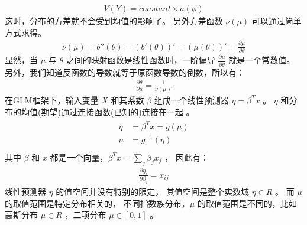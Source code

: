 \documentclass[letterpaper,10pt,english]{sphinxmanual}
\begin{document}
\begin{equation}\label{equation:广义线性模型/estimate:广义线性模型/estimate:3}
\begin{split}V(Y)=constant \times a(\phi)\end{split}
\end{equation}
这时，分布的方差就不会受到均值的影响了。
另外方差函数 \(\nu(\mu)\) 可以通过简单方式求得。
\begin{equation}\label{equation:广义线性模型/estimate:广义线性模型/estimate:4}
\begin{split}\nu(\mu) = b''(\theta) =(b'(\theta))'= (\mu(\theta))' = \frac{\partial \mu}{\partial \theta}\end{split}
\end{equation}
显然，当 \(\mu\) 与 \(\theta\) 之间的映射函数是线性函数时，一阶偏导 \(\frac{\partial \mu}{\partial \theta}\)
就是一个常数值。另外，我们知道反函数的导数就等于原函数导数的倒数，所以有：
\begin{equation}\label{equation:广义线性模型/estimate:广义线性模型/estimate:5}
\begin{split}\frac{\partial \theta}{\partial \mu} = \frac{1}{\nu(\mu)}\end{split}
\end{equation}
在GLM框架下，输入变量 \(X\) 和其系数 \(\beta\)
组成一个线性预测器 \(\eta=\beta^Tx\) 。
\(\eta\) 和分布的均值(期望)通过连接函数(已知的)连接在一起 。
\begin{align}\label{equation:广义线性模型/estimate:广义线性模型/estimate:6}\!\begin{aligned}
\eta &=\beta^Tx = g(\mu)\\
\mu &= g^{-1}(\eta)\\
\end{aligned}\end{align}
其中 \(\beta\) 和 \(x\) 都是一个向量，\(\beta^Tx = \sum_j \beta_j x_j\) ，
因此有：
\begin{equation}\label{equation:广义线性模型/estimate:广义线性模型/estimate:7}
\begin{split}\frac{\partial \eta_i}{\partial \beta_j} = x_{ij}\end{split}
\end{equation}
线性预测器 \(\eta\) 的值空间并没有特别的限定，
其值空间是整个实数域 \(\eta \in R\) 。
而 \(\mu\) 的取值范围是特定分布相关的，
不同指数族分布，\(\mu\) 的取值范围是不同的，比如高斯分布 \(\mu \in R\)
，二项分布 \(\mu \in [0,1]\) 。
\end{document}
